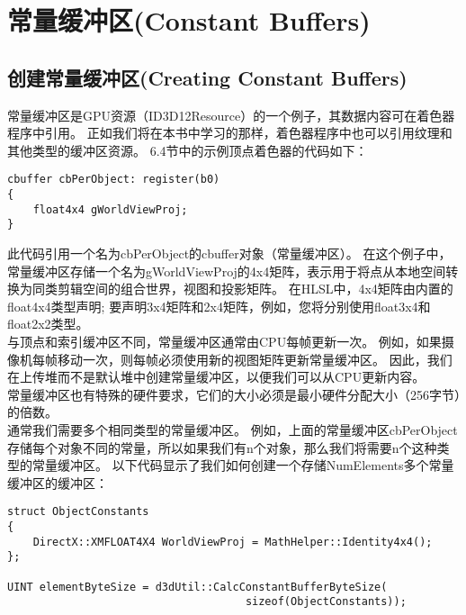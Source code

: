 \section{常量缓冲区(Constant Buffers)}
\subsection{创建常量缓冲区(Creating Constant Buffers)}
\begin{flushleft}
常量缓冲区是GPU资源（ID3D12Resource）的一个例子，其数据内容可在着色器程序中引用。 正如我们将在本书中学习的那样，着色器程序中也可以引用纹理和其他类型的缓冲区资源。 6.4节中的示例顶点着色器的代码如下：
\begin{lstlisting}
cbuffer cbPerObject: register(b0)
{
    float4x4 gWorldViewProj;
}
\end{lstlisting}
此代码引用一个名为cbPerObject的cbuffer对象（常量缓冲区）。 在这个例子中，常量缓冲区存储一个名为gWorldViewProj的4x4矩阵，表示用于将点从本地空间转换为同类剪辑空间的组合世界，视图和投影矩阵。 在HLSL中，4x4矩阵由内置的float4x4类型声明; 要声明3x4矩阵和2x4矩阵，例如，您将分别使用float3x4和float2x2类型。\\
与顶点和索引缓冲区不同，常量缓冲区通常由CPU每帧更新一次。 例如，如果摄像机每帧移动一次，则每帧必须使用新的视图矩阵更新常量缓冲区。 因此，我们在上传堆而不是默认堆中创建常量缓冲区，以便我们可以从CPU更新内容。\\
常量缓冲区也有特殊的硬件要求，它们的大小必须是最小硬件分配大小（256字节）的倍数。\\
通常我们需要多个相同类型的常量缓冲区。 例如，上面的常量缓冲区cbPerObject存储每个对象不同的常量，所以如果我们有n个对象，那么我们将需要n个这种类型的常量缓冲区。 以下代码显示了我们如何创建一个存储NumElements多个常量缓冲区的缓冲区：
\begin{lstlisting}
struct ObjectConstants
{
    DirectX::XMFLOAT4X4 WorldViewProj = MathHelper::Identity4x4();
};

UINT elementByteSize = d3dUtil::CalcConstantBufferByteSize(
                                     sizeof(ObjectConstants));


\end{lstlisting}
\end{flushleft}
